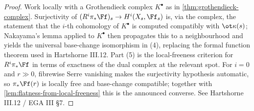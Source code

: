 \begin{proof}
  Work locally with a Grothendieck complex $K^\bullet$ as in
  \cref{thm:grothendieck-complex}. Surjectivity of
  $(R^i\pi_*\Ff)_s\to H^i(X_s,\Ff_s)$ is, via the complex, the statement that the
  $i$-th cohomology of $K^\bullet$ is computed compatibly with $\ot\kappa(s)$;
  Nakayama's lemma applied to $K^\bullet$ then propagates this to a neighbourhood
  and yields the universal base-change isomorphism in (4), replacing the formal
  function theorem used in Hartshorne III.12. Part (5) is the local-freeness
  criterion for $R^i\pi_*\Ff$ in terms of exactness of the dual complex at the
  relevant spot. For $i=0$ and $r\gg 0$, fibrewise Serre vanishing makes the
  surjectivity hypothesis automatic, so $\pi_*\Ff(r)$ is locally free and
  base-change compatible; together with \cref{lem:flatness-from-local-freeness}
  this is the announced converse. See Hartshorne III.12 / EGA III §7.
\end{proof}

